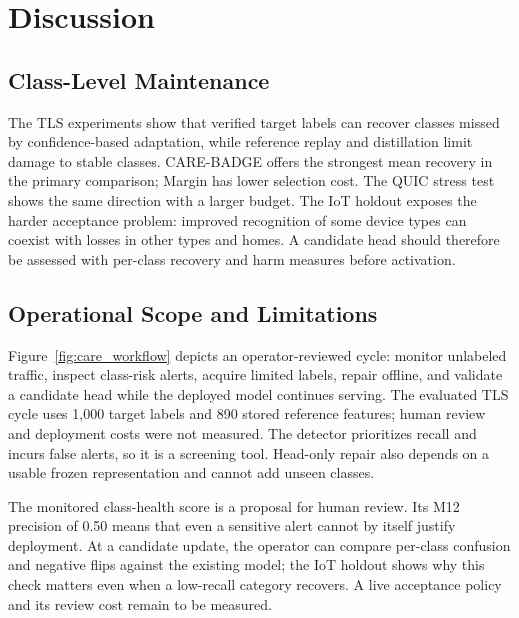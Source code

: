 \documentclass[journal]{IEEEtran}
\begin{document}


\section{Discussion}
\label{sec:discussion}

\subsection{Class-Level Maintenance}
\label{sec:discussion_efficacy}
The TLS experiments show that verified target labels can recover classes missed by confidence-based adaptation, while reference replay and distillation limit damage to stable classes. CARE-BADGE offers the strongest mean recovery in the primary comparison; Margin has lower selection cost. The QUIC stress test shows the same direction with a larger budget. The IoT holdout exposes the harder acceptance problem: improved recognition of some device types can coexist with losses in other types and homes. A candidate head should therefore be assessed with per-class recovery and harm measures before activation.

\subsection{Operational Scope and Limitations}
\label{sec:discussion_deployment}
\label{sec:discussion_iot}
\label{sec:discussion_limitations}
Figure~\ref{fig:care_workflow} depicts an operator-reviewed cycle: monitor unlabeled traffic, inspect class-risk alerts, acquire limited labels, repair offline, and validate a candidate head while the deployed model continues serving. The evaluated TLS cycle uses 1{,}000 target labels and 890 stored reference features; human review and deployment costs were not measured. The detector prioritizes recall and incurs false alerts, so it is a screening tool. Head-only repair also depends on a usable frozen representation and cannot add unseen classes.

The monitored class-health score is a proposal for human review. Its M12 precision of 0.50 means that even a sensitive alert cannot by itself justify deployment. At a candidate update, the operator can compare per-class confusion and negative flips against the existing model; the IoT holdout shows why this check matters even when a low-recall category recovers. A live acceptance policy and its review cost remain to be measured.
\end{document}

